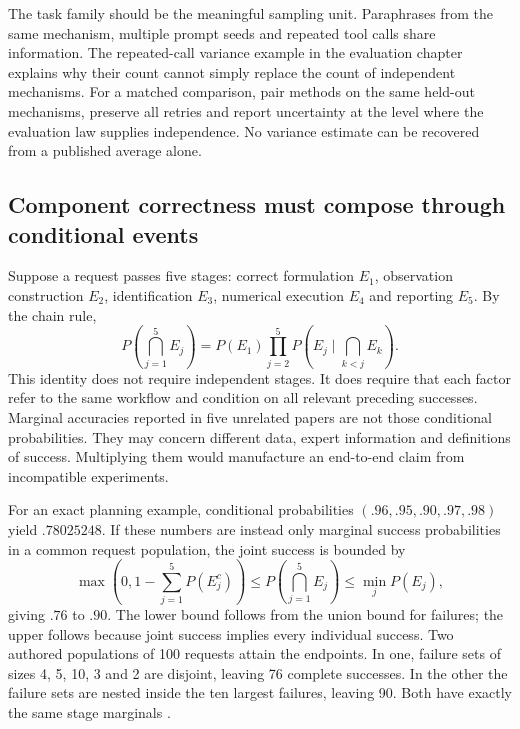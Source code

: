 The task family should be the meaningful sampling unit. Paraphrases from the
same mechanism, multiple prompt seeds and repeated tool calls share information.
The repeated-call variance example in the evaluation chapter explains why
their count cannot simply replace the count of independent mechanisms. For a
matched comparison, pair methods on the same held-out mechanisms, preserve all
retries and report uncertainty at the level where the evaluation law supplies
independence. No variance estimate can be recovered from a published average
alone.

\subsection{Component correctness must compose through conditional events}

Suppose a request passes five stages: correct formulation $E_1$, observation
construction $E_2$, identification $E_3$, numerical execution $E_4$ and
reporting $E_5$. By the chain rule,
\begin{equation}
 P\!\left(\bigcap_{j=1}^5 E_j\right)
 =P(E_1)\prod_{j=2}^5P\!\left(E_j\mid\bigcap_{k<j}E_k\right).
 \label{exec13:frontier-chain}
\end{equation}
This identity does not require independent stages. It does require that each
factor refer to the same workflow and condition on all relevant preceding
successes. Marginal accuracies reported in five unrelated papers are not those
conditional probabilities. They may concern different data, expert information
and definitions of success. Multiplying them would manufacture an end-to-end
claim from incompatible experiments.

For an exact planning example, conditional probabilities
$(.96,.95,.90,.97,.98)$ yield $.78025248$. If these numbers are instead only
marginal success probabilities in a common request population, the joint
success is bounded by
\begin{equation}
 \max\!\left(0,1-\sum_{j=1}^5P(E_j^c)\right)
 \leq P\!\left(\bigcap_{j=1}^5 E_j\right)
 \leq\min_jP(E_j),
 \label{exec13:frontier-frechet}
\end{equation}
giving $.76$ to $.90$. The lower bound follows from the union bound for
failures; the upper follows because joint success implies every individual
success. Two authored populations of 100 requests attain the endpoints. In
one, failure sets of sizes 4, 5, 10, 3 and 2 are disjoint, leaving 76 complete
successes. In the other the failure sets are nested inside the ten largest
failures, leaving 90. Both have exactly the same stage marginals
\citep{exec13_frontier_exact}.


